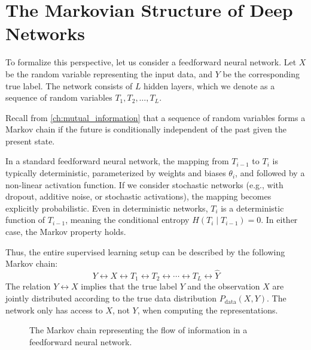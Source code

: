 \section{The Markovian Structure of Deep Networks}

To formalize this perspective, let us consider a feedforward neural network. Let $X$ be the random variable representing the input data, and $Y$ be the corresponding true label. The network consists of $L$ hidden layers, which we denote as a sequence of random variables $T_1, T_2, \ldots, T_L$. 

Recall from \cref{ch:mutual_information} that a sequence of random variables forms a Markov chain if the future is conditionally independent of the past given the present state. 

In a standard feedforward neural network, the mapping from $T_{i-1}$ to $T_i$ is typically deterministic, parameterized by weights and biases $\theta_i$, and followed by a non-linear activation function. If we consider stochastic networks (e.g., with dropout, additive noise, or stochastic activations), the mapping becomes explicitly probabilistic. Even in deterministic networks, $T_i$ is a deterministic function of $T_{i-1}$, meaning the conditional entropy $H(T_i \mid T_{i-1}) = 0$. In either case, the Markov property holds.

Thus, the entire supervised learning setup can be described by the following Markov chain:
\[ Y \leftrightarrow X \leftrightarrow T_1 \leftrightarrow T_2 \leftrightarrow \cdots \leftrightarrow T_L \leftrightarrow \hat{Y} \]
The relation $Y \leftrightarrow X$ implies that the true label $Y$ and the observation $X$ are jointly distributed according to the true data distribution $P_{\text{data}}(X, Y)$. The network only has access to $X$, not $Y$, when computing the representations.

\begin{figure}[ht]
\centering
{}
\caption{The Markov chain representing the flow of information in a feedforward neural network.}
\label{fig:nn_markov}
\end{figure}

